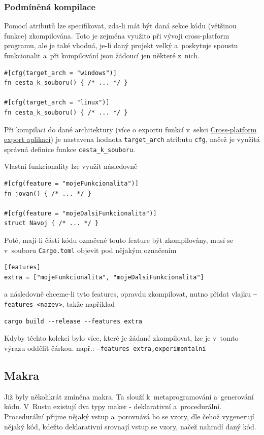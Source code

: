 \documentclass[a4paper, 12pt]{article} %
\newcommand{\rust}[1]{\texttt{#1}}
\begin{document}
        \subsubsection*{Podmíněná kompilace}
            Pomocí atributů lze specifikovat, zda-li mát být daná sekce kódu (většinou funkce) zkompilována. Toto je zejména využito při vývoji cross-platform programu, ale je také vhodná, je-li daný projekt velký a~poskytuje spoustu funkcionalit a~při kompilování jsou žádoucí jen některé z~nich.
            \begin{verbatim}
#[cfg(target_arch = "windows")]
fn cesta_k_souboru() { /* ... */ }

#[cfg(target_arch = "linux")]
fn cesta_k_souboru() { /* ... */ }
            \end{verbatim}
            
            Při kompilaci do dané architektury (více o exportu funkcí v~sekci \hyperlink{cross-platform}{Cross-platform export aplikací}) je nastavena hodnota \rust{target_arch} atributu \rust{cfg}, načež je využitá správná definice funkce \rust{cesta_k_souboru}.
            
            Vlastní funkcionality lze využít následovně
            \begin{verbatim}
#[cfg(feature = "mojeFunkcionalita")]
fn jovan() { /* ... */ }

#[cfg(feature = "mojeDalsiFunkcionalita")]
struct Navoj { /* ... */ }
            \end{verbatim}
            
            Poté, mají-li části kódu označené touto feature být zkompilovány, musí se v~souboru \texttt{Cargo.toml} objevit pod nějakým označením
            \begin{verbatim}
[features]
extra = ["mojeFunkcionalita", "mojeDalsiFunkcionalita"]
            \end{verbatim}
            
            a následovně chceme-li tyto features, opravdu zkompilovat, nutno přidat vlajku \texttt{--features <nazev>}, takže například
            \begin{verbatim}
cargo build --release --features extra 
            \end{verbatim}
            
            Kdyby těchto kolekcí bylo více, které je žádané zkompilovat, lze je v~tomto výrazu oddělit čárkou. např.: \texttt{--features extra,experimentalni} 


    \subsection{Makra}
        Již byly několikrát zmíněna makra. Ta slouží k~metaprogramování a~generování kódu. V~Rustu existují dva typy maker - deklarativní a~procedurální. Procedurální přijme nějaký vstup a~porovnává ho se vzory, dle čehož vygenerují nějaký kód, kdežto deklarativní srovnají vstup se vzory, načež nahradí daný kód.
\end{document}
